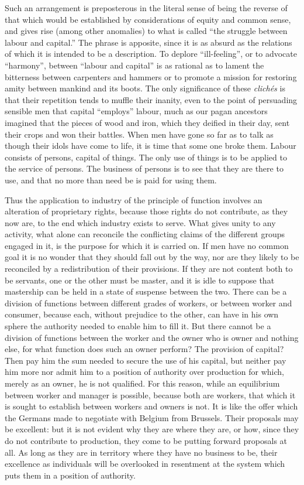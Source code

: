 \documentclass{book}
\begin{document}
Such an arrangement is preposterous in the literal sense of being the reverse of that which would be established by considerations of equity and common sense, and gives rise (among other anomalies) to what is called “the struggle between labour and capital.” The phrase is apposite, since it is as absurd as the relations of which it is intended to be a description. To deplore “ill-feeling”, or to advocate “harmony”, between “labour and capital” is as rational as to lament the bitterness between carpenters and hammers or to promote a mission for restoring amity between mankind and its boots. The only significance of these \emph{clichés} is that their repetition tends to muffle their inanity, even to the point of persuading sensible men that capital “employs” labour, much as our pagan ancestors imagined that the pieces of wood and iron, which they deified in their day, sent their crops and won their battles. When men have gone so far as to talk as though their idols have come to life, it is time that some one broke them. Labour consists of persons, capital of things. The only use of things is to be applied to the service of persons. The business of persons is to see that they are there to use, and that no more than need be is paid for using them.

Thus the application to industry of the principle of function involves an alteration of proprietary rights, because those rights do not contribute, as they now are, to the end which industry exists to serve. What gives unity to any activity, what alone can reconcile the conflicting claims of the different groups engaged in it, is the purpose for which it is carried on. If men have no common goal it is no wonder that they should fall out by the way, nor are they likely to be reconciled by a redistribution of their provisions. If they are not content both to be servants, one or the other must be master, and it is idle to suppose that mastership can be held in a state of suspense between the two. There can be a division of functions between different grades of workers, or between worker and consumer, because each, without prejudice to the other, can have in his own sphere the authority needed to enable him to fill it. But there cannot be a division of functions between the worker and the owner who is owner and nothing else, for what function does such an owner perform? The provision of capital? Then pay him the sum needed to secure the use of his capital, but neither pay him more nor admit him to a position of authority over production for which, merely as an owner, he is not qualified. For this reason, while an equilibrium between worker and manager is possible, because both are workers, that which it is sought to establish between workers and owners is not. It is like the offer which the Germans made to negotiate with Belgium from Brussels. Their proposals may be excellent: but it is not evident why they are where they are, or how, since they do not contribute to production, they come to be putting forward proposals at all. As long as they are in territory where they have no business to be, their excellence as individuals will be overlooked in resentment at the system which puts them in a position of authority.
\end{document}

